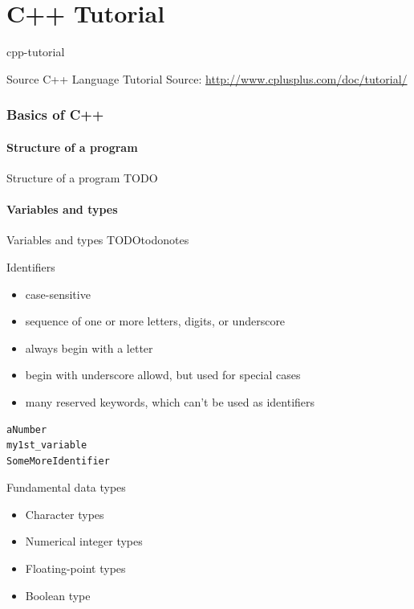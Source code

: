 \documentclass{beamer}
\begin{document}
\part{C++ Tutorial}{cpp-tutorial}

\begin{frame}{Source}
C++ Language Tutorial
Source: \url{http://www.cplusplus.com/doc/tutorial/}
\end{frame}

\section{Basics of C++}

\subsection{Structure of a program}
\begin{frame}{Structure of a program}
TODO
\end{frame}

\subsection{Variables and types}
\begin{frame}{Variables and types}
TODOtodonotes
\end{frame}


\begin{frame}[fragile]{Identifiers}
\begin{itemize}
  \item case-sensitive
  \item sequence of one or more letters, digits, or underscore
  \item always begin with a letter
  \item begin with underscore allowd, but used for special cases
  \item many reserved keywords, which can't be used as identifiers 
\end{itemize}
\begin{lstlisting}[caption=Identifiers Examples]
aNumber
my1st_variable
SomeMoreIdentifier
\end{lstlisting}
\end{frame}

\begin{frame}{Fundamental data types}
\begin{itemize}
  \item Character types
  \item Numerical integer types
  \item Floating-point types
  \item Boolean type
\end{itemize}
\end{frame}
\end{document}
